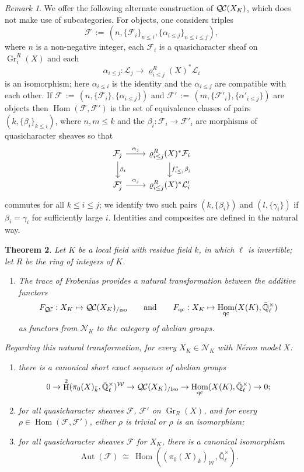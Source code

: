 \documentclass[10pt]{amsart}
\theoremstyle{plain}
\newtheorem{theorem}{Theorem}[section]
\theoremstyle{definition}
\theoremstyle{remark}
\newtheorem{remark}[theorem]{Remark}
\newcommand{\EE}{\mathbb{\bar Q}_\ell}
\newcommand{\bFq}{\bar{k}}
\newcommand{\Fq}{k}
\newcommand{\EEx}{\EE^\times}
\newcommand{\Weil}[1]{\mathcal{W}_{#1}}
\DeclareMathOperator{\Aut}{Aut}
\DeclareMathOperator{\Hom}{Hom}
\DeclareMathOperator{\Gr}{Gr}
\DeclareMathOperator{\Hh}{H}
\newcommand{\ceq}{{\, :=\, }}
\newcommand{\iso}{{\ \cong\ }}
\newcommand{\qcs}[1]{{\mathcal{#1}}}
\newcommand{\QC}{{\mathcal{Q\hskip-0.8pt C}}}
\newcommand{\QCiso}[1]{\QC(#1)_{/\text{iso}}}
\begin{document}
\begin{remark}
We offer the following alternate construction of $\QC(X_K)$, which does not make use of subcategories.
For objects, one considers triples 
\[
\qcs{F} \ceq (n, \{\qcs{F}_i\}_{n\leq i}, \{\alpha_{i \le j}\}_{n\le i \le j}),
\] where $n$
is a non-negative integer, each $\qcs{F}_i$ is a quasicharacter sheaf on $\Gr^R_i(X)$ and each 
\[
\alpha_{i \le j} : \qcs{L}_j \to \varrho^R_{i \le j}(X)^* \qcs{L}_i
\]
 is an isomorphism; here $\alpha_{i \le i}$ is the identity and the $\alpha_{i \le j}$ are compatible with each other.  
If $\qcs{F} \ceq (n, \{\qcs{F}_i\}, \{\alpha_{i \le j}\})$
and $\qcs{F}' \ceq (m, \{\qcs{F}'_i\}, \{\alpha'_{i \le j}\})$ are objects then $\Hom(\qcs{F}, \qcs{F}')$ is the set
of equivalence classes of pairs $(k, \{\beta_i\}_{k \le i})$, where $n,m \le k$ and the $\beta_i : \qcs{F}_i \to \qcs{F}'_i$ are
morphisms of quasicharacter sheaves so that
\[
\begin{tikzcd}
\qcs{F}_j \rar{\alpha_j} \dar{\beta_i} & \varrho^R_{i \le j}(X)^* \qcs{F}_i \dar{f_{i \le j}^*\beta_j} \\
\qcs{F}'_j \rar{\alpha_j} & \varrho^R_{i \le j}(X)^* \qcs{L}'_i
\end{tikzcd}
\]
commutes for all $k\le i\le j$; we identify two such pairs $(k, \{\beta_i\})$ and $(l, \{\gamma_i\})$ if $\beta_i = \gamma_i$
for sufficiently large $i$.  Identities and composites are defined in the natural way.
\end{remark}


\begin{theorem}\label{thm:QCXK}
Let $K$ be a local field with residue field $\Fq$, in which $\ell$ is invertible; 
let $R$ be the ring of integers of $K$.
\begin{enumerate}
\item
The trace of Frobenius provides a natural transformation between the additive functors
\[
F_{\QC}: X_K \mapsto \QCiso{X_K}
\qquad\text{and}\qquad
F_{\text{qc}}: X_K \mapsto \Hom_{\text{qc}}(X(K),\EEx)
\]
as functors from $\mathcal{N}_K$ to the category of abelian groups.
\end{enumerate} 
Regarding this natural transformation, for every $X_K \in \mathcal{N}_K$ with N\'eron model $X$:
\begin{enumerate}[resume]
\item there is a canonical short exact sequence of abelian groups 
\[
0 \to \Hh^2(\pi_0(X)_{\bFq},\EEx)^{\Weil{}} \to \QCiso{X_K} \to \Hom_\text{qc}(X(K),\EEx) \to 0;
\] 
\item for all quasicharacter sheaves $\qcs{F}$, $\qcs{F}'$ on $\Gr_R(X)$, and for every $\rho \in \Hom(\qcs{F},\qcs{F}')$, either $\rho$ is trivial or $\rho$ is an isomorphism;
\item for all quasicharacter sheaves $\qcs{F}$ for $X_K$, there is a canonical isomorphism
\[
\Aut(\qcs{F}) \iso \Hom((\pi_0(X)_{\bFq})_{\Weil{}},\EEx).
\]
\end{enumerate}
\end{theorem}
\end{document}

